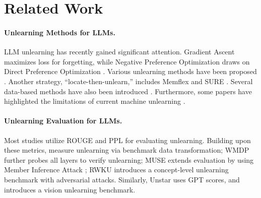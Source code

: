 \section{Related Work}
\paragraph{Unlearning Methods for LLMs.}
LLM unlearning has recently gained significant attention.
Gradient Ascent \citep{ga} maximizes loss for forgetting, while Negative Preference Optimization \citep{npo} draws on Direct Preference Optimization \citep{DPO}.
Various unlearning methods have been proposed \citep{NEURIPS2022_b125999b,eldan2023whosharrypotterapproximate,yu-etal-2023-unlearning,chen2023unlearnwantforgetefficient,pawelczyk2024incontextunlearninglanguagemodels, gandikota2024erasingconceptualknowledgelanguage,liu-etal-2024-towards-safer,seyitoğlu2024extractingunlearnedinformationllms,ding2024unifiedparameterefficientunlearningllms,baluta2024unlearninginvsoutofdistribution, zhuang2024uoeunlearningexpertmixtureofexperts, wei2025underestimatedprivacyrisksminority}.
Another strategy, ``locate-then-unlearn,'' includes Memflex \citep{tian2024forgetnotpracticalknowledge} and SURE \citep{zhang2024doesllmtrulyunlearn}. 
Several data-based methods have also been introduced \citep{jang2022knowledgeunlearningmitigatingprivacy,ma2024unveilingentitylevelunlearninglarge, liu2024learningrefusemitigatingprivacy,gu2024meowmemorysupervisedllm, sinha2024unstarunlearningselftaughtantisample,mekala-etal-2025-alternate}. 
Furthermore, some papers have highlighted the limitations of current machine unlearning \citep{10488864, zhou2024limitationsprospectsmachineunlearning, thaker2024positionllmunlearningbenchmarks, cooper2024machineunlearningdoesntthink, barez2025openproblemsmachineunlearning}.
\paragraph{Unlearning Evaluation for LLMs.}
Most studies \citep{maini2024tofutaskfictitiousunlearning, tian2024forgetnotpracticalknowledge} utilize ROUGE and PPL for evaluating unlearning.
Building upon these metrics, 
\citet{joshi-etal-2024-towards} measure unlearning via benchmark data transformation;
WMDP \citep{pmlr-v235-li24bc} further probes all layers to verify unlearning;
MUSE \citep{shi2024musemachineunlearningsixway} extends evaluation by using Member Inference Attack \citep{kim2024detectingtrainingdatalarge};
RWKU \citep{jin2024rwku} introduces a concept-level unlearning benchmark with adversarial attacks.
Similarly, Unstar \citep{sinha2024unstarunlearningselftaughtantisample} uses GPT scores, and \citet{ma2024benchmarkingvisionlanguagemodel} introduces a vision unlearning benchmark.